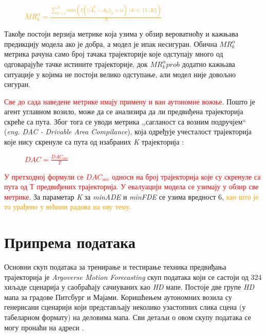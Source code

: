 \documentclass[11pt,oneside]{memoir}
\begin{document}
\begin{figure}[H]
  \centering
  \textcolor{orange}{$MR^{\alpha}_{k} = \frac{\sum^N_{n=1} min(I(||\hat{A}^{k}_{n} - A_{n}||_{2} > \alpha)\ |\ k\ \in\ \{1..K\})}{N}$}
\end{figure}

Такође постоји верзија метрике која узима у обзир вероватноћу и кажњава предикцију модела ако је добра, а модел је ипак несигуран. \cite{argoverse}
Обична $MR^{\alpha}_{k}$ метрика рачуна само број тачака трајекторије које одступају много од одговарајуће тачке истините трајекторије, док
$MR^{\alpha}_{k}{prob}$ додатно кажњава ситуације у којима не постоји велико одступање, али модел није довољно сигуран. 

\textcolor{red}{Све до сада наведене метрике имају примену и ван аутономне вожње}. Пошто је агент углавном возило, може да
се анализира да ли предвиђена трајекторија скреће са пута. Због тога се уводи метрика ,,сагланост са возним подручјем`` 
(\textit{eng. DAC - Drivable Area Compilance}), која одређује учесталост трајекторија које нису скренуле са пута од изабраних 
\textit{K} трајекторија \cite{argoverse}:

\begin{figure}[H]
  \centering
  \textcolor{red}{$DAC = \frac{DAC_{occ}}{T}$}
\end{figure}

\textcolor{red}{У претходној формули се $DAC_{occ}$ односи на број трајекторија које су скренуле са пута од Т предвиђених трајекторија. 
У евалуацији модела се узимају у обзир све метрике}. За параметар \textit{K} за \textit{minADE} и \textit{minFDE} се узима вредност 6,
\textcolor{orange}{као што је то урађено у већини радова на ову тему.}

\chapter{Припрема података \label{initprep}}

Основни скуп података за тренирање и тестирање техника предвиђања трајекторија је \textit{Argoverse Motion Forecasting} скуп података
који се састоји од 324 хиљаде сценарија у саобраћају сачиуваних као \textit{HD} мапе. Постоје две групе \textit{HD} мапа
за градове Питсбург и Мајами. Коришћењем аутономних возила су генерисани сценарији који представљају неколико узастопних слика сцена (у табеларном формату)
на деловима мапа. Сви детаљи о овом скупу података се могу пронаћи на адреси 
\href{https://www.argoverse.org/index.html}{\color{blue}{www.argoverse.org}} \cite{argoverse}. \\
\end{document}
